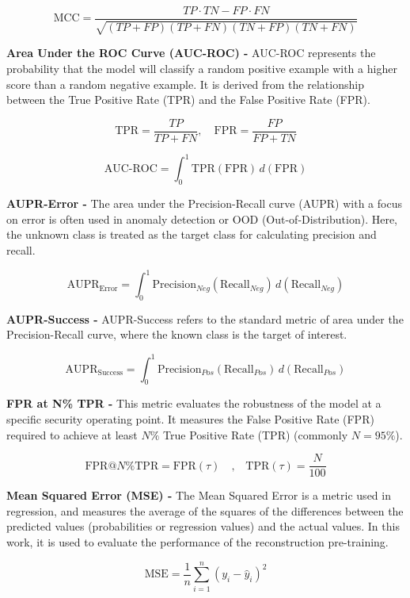\begin{equation}
\text{MCC} = \frac{TP \cdot TN - FP \cdot FN}{\sqrt{(TP + FP)(TP + FN)(TN + FP)(TN + FN)}}
\end{equation}

\textbf{Area Under the ROC Curve (AUC-ROC) - } AUC-ROC represents the probability that the model will classify a random positive example with a higher score than a random negative example. It is derived from the relationship between the True Positive Rate (TPR) and the False Positive Rate (FPR).

\begin{equation}
\text{TPR} = \frac{TP}{TP + FN}, \quad \text{FPR} = \frac{FP}{FP + TN}
\end{equation}

\begin{equation}
\text{AUC-ROC} = \int_{0}^{1} \text{TPR}(\text{FPR}) \, d(\text{FPR})
\end{equation}

\textbf{AUPR-Error - } The area under the Precision-Recall curve (AUPR) with a focus on error is often used in anomaly detection or OOD (Out-of-Distribution). Here, the unknown class is treated as the target class for calculating precision and recall.

\begin{equation}
\text{AUPR}_{\text{Error}} = \int_{0}^{1} \text{Precision}_{Neg}(\text{Recall}_{Neg}) \, d(\text{Recall}_{Neg})
\end{equation}

\textbf{AUPR-Success - } AUPR-Success refers to the standard metric of area under the Precision-Recall curve, where the known class is the target of interest.

\begin{equation}
\text{AUPR}_{\text{Success}} = \int_{0}^{1} \text{Precision}_{Pos}(\text{Recall}_{Pos}) \, d(\text{Recall}_{Pos})
\end{equation}

\textbf{FPR at N\% TPR - } This metric evaluates the robustness of the model at a specific security operating point. It measures the False Positive Rate (FPR) required to achieve at least $N\%$ True Positive Rate (TPR) (commonly $N=95\%$).

\begin{equation}
\text{FPR}@N\%\text{TPR} = \text{FPR}(\tau) \quad \text{,} \quad \text{TPR}(\tau) = \frac{N}{100}
\end{equation}

\textbf{Mean Squared Error (MSE) - } The Mean Squared Error is a metric used in regression, and measures the average of the squares of the differences between the predicted values (probabilities or regression values) and the actual values. In this work, it is used to evaluate the performance of the reconstruction pre-training.

\begin{equation}
\text{MSE} = \frac{1}{n} \sum_{i=1}^{n} (y_i - \hat{y}_i)^2
\end{equation}
